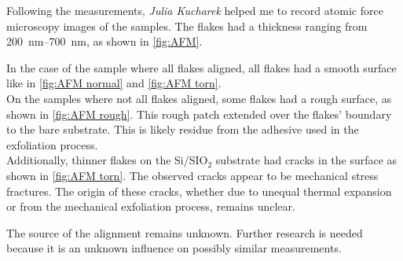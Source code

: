 \documentclass[
	twoside,
	parskip=half,
	a4paper,
]{scrbook}
\begin{document}
Following the measurements, \textit{Julia Kucharek} helped me to record atomic force microscopy images of the samples.
The flakes had a thickness ranging from \SIrange{200}{700}{nm}, as shown in \autoref{fig:AFM}.

In the case of the sample where all flakes aligned, all flakes had a smooth surface like in \autoref{fig:AFM normal} and \autoref{fig:AFM torn}.\\
On the samples where not all flakes aligned, some flakes had a rough surface, as shown in \autoref{fig:AFM rough}.
This rough patch extended over the flakes' boundary to the bare substrate.
This is likely residue from the adhesive used in the exfoliation process.\\
Additionally, thinner flakes on the Si/SIO$_2$ substrate had cracks in the surface as shown in \autoref{fig:AFM torn}.
The observed cracks appear to be mechanical stress fractures.
The origin of these cracks, whether due to unequal thermal expansion or from the mechanical exfoliation process, remains unclear. 

The source of the alignment remains unknown. 
Further research is needed because it is an unknown influence on possibly similar measurements.
\end{document}
